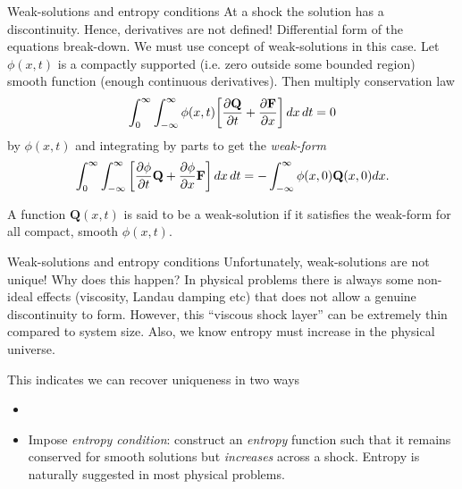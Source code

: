 \documentclass[aspectratio=169]{beamer}
\newcommand{\pfrac}[2]{\frac{\partial #1}{\partial #2}}
\newcommand{\mvec}[1]{\mathbf{#1}}
\begin{document}
\begin{frame}{Weak-solutions and entropy conditions}
  \footnotesize%
  At a shock the solution has a discontinuity. Hence, derivatives are
  not defined! Differential form of the equations break-down. We must
  use concept of weak-solutions in this case.%
  \vskip0.1in%
  Let $\phi(x,t)$ is a compactly supported (i.e. zero outside some
  bounded region) smooth function (enough continuous
  derivatives). Then multiply conservation law
  \begin{align*}
    \int_0^\infty  \int_{-\infty}^\infty \phi(x,t)
    \bigg[\pfrac{\mvec{Q}}{t} + \pfrac{\mvec{F}}{x}\bigg]\thinspace
    dx\thinspace dt = 0
  \end{align*}
  by $\phi(x,t)$ and integrating by parts to get the \emph{weak-form}
  \begin{align*}
    \int_0^\infty  \int_{-\infty}^\infty 
    \bigg[\pfrac{\phi}{t} \mvec{Q} + \pfrac{\phi}{x} \mvec{F}\bigg]\thinspace
    dx\thinspace dt
    =
    -
    \int_{-\infty}^\infty \phi(x,0) \mvec{Q}(x,0) dx.
  \end{align*}  
  \begin{definition}
    A function $\mvec{Q}(x,t)$ is said to be a weak-solution if it
    satisfies the weak-form for all compact, smooth $\phi(x,t)$.
  \end{definition}
  
\end{frame}

\begin{frame}{Weak-solutions and entropy conditions}
  Unfortunately, weak-solutions are not unique! Why does this happen?
  \vskip0.1in%
  In physical problems there is always some non-ideal effects
  (viscosity, Landau damping etc) that does not allow a genuine
  discontinuity to form. However, this ``viscous shock layer'' can be
  extremely thin compared to system size. Also, we know entropy must
  increase in the physical universe.

  \vskip0.1in%
  This indicates we can recover uniqueness in two ways
  \begin{itemize}
  \item {\color{gray}{Add a viscous (diffusion) term and take limit of
      viscosity going to zero. (Generally not convenient for numerical
      work)}}%
  \item Impose \emph{entropy condition}: construct an \emph{entropy}
    function such that it remains conserved for smooth solutions but
    \emph{increases} across a shock. Entropy is naturally suggested in
    most physical problems.
  \end{itemize}  
\end{frame}
\end{document}
